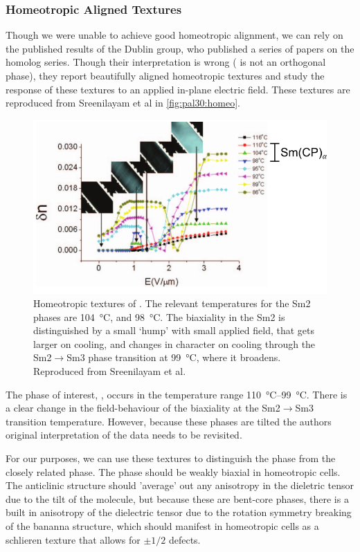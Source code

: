 \documentclass[aagreenthesis]{subfiles}
\begin{document}
\subsubsection{Homeotropic Aligned Textures}
Though we were unable to achieve good homeotropic alignment, we can rely on the
published results of the Dublin group, who published a series of papers on the
\nfour{} homolog
series\cite{panarin_sequence_2011,sreenilayam_properties_2012,SreenilayamOccurrenceFiveDifferent2015,sreenilayam_spontaneous_2016}.
Though their interpretation is wrong (\nfour{} is not an orthogonal phase), they
report beautifully aligned homeotropic textures and study the response of these
textures to an applied in-plane electric field. These textures are reproduced from Sreenilayam et
al\cite{sreenilayam_properties_2012} in \autoref{fig:pal30:homeo}.
\begin{figure}[h!]
    \centering
    \includegraphics[width=.8\textwidth]{figs/pal30/fromPapers/textures/pal30-Homeo-2012-labelled.png}
    \caption{ \label{fig:pal30:homeo} Homeotropic textures of \nfour{}. The relevant temperatures for the Sm2 phases are \SI{104}{\degreeCelsius}, and \SI{98}{\degreeCelsius}. The biaxiality in the Sm2 is distinguished by a small `hump' with small applied field, that gets larger on cooling, and changes in character on cooling through the Sm2$\rightarrow$Sm3 phase transition at \SI{99}{\degreeCelsius}, where it broadens. Reproduced from Sreenilayam et al\cite{sreenilayam_properties_2012}.}
\end{figure}


The phase of interest, \smcpalpha, occurs in the temperature range \SIrange{110}{99}{\degreeCelsius}. There is a clear change in the field-behaviour of the biaxiality at the Sm2$\rightarrow$Sm3 transition temperature. However, because these phases are tilted the authors original interpretation of the data needs to be revisited.  

For our purposes, we can use these textures to distinguish the \smcpalpha{} phase
from the closely related \smcapa{} phase. The \smcapa{} phase should be weakly
biaxial in homeotropic cells. The anticlinic structure should 'average' out any
anisotropy in the dieletric tensor due to the tilt of the molecule, but because
these are bent-core phases, there is a built in anisotropy of the dielectric
tensor due to the rotation symmetry breaking of the bananna structure, which
should manifest in homeotropic cells as a schlieren texture that allows for $\pm
1/2$ defects.
\end{document}
